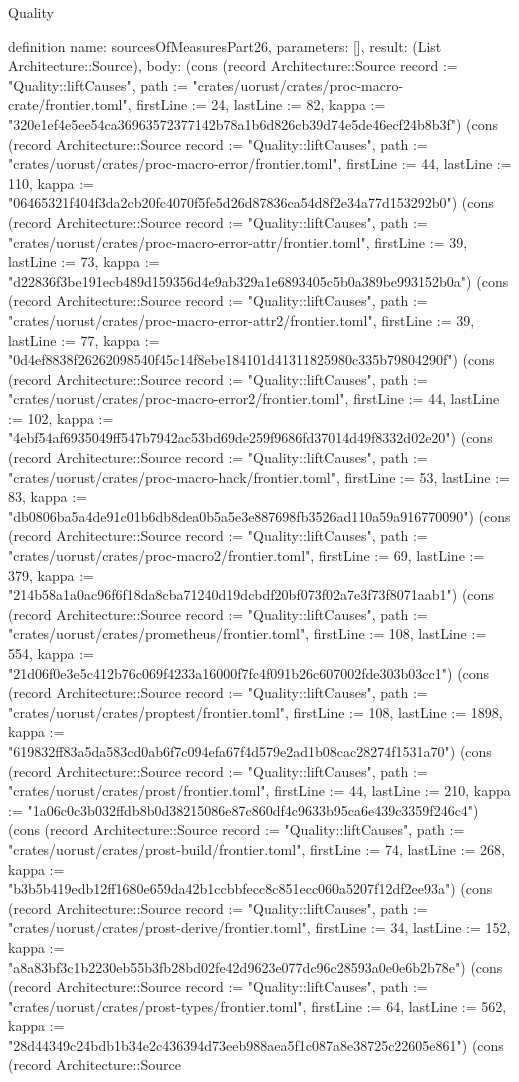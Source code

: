 \begin{lexlean}{Quality}
\begin{semanticmodule}
definition{
  name: sourcesOfMeasuresPart26,
  parameters: [],
  result: (List Architecture::Source),
  body: (cons (record Architecture::Source {record := "Quality::liftCauses", path := "crates/uorust/crates/proc-macro-crate/frontier.toml", firstLine := 24, lastLine := 82, kappa := "320e1ef4e5ee54ca36963572377142b78a1b6d826cb39d74e5de46ecf24b8b3f"}) (cons (record Architecture::Source {record := "Quality::liftCauses", path := "crates/uorust/crates/proc-macro-error/frontier.toml", firstLine := 44, lastLine := 110, kappa := "06465321f404f3da2cb20fc4070f5fe5d26d87836ca54d8f2e34a77d153292b0"}) (cons (record Architecture::Source {record := "Quality::liftCauses", path := "crates/uorust/crates/proc-macro-error-attr/frontier.toml", firstLine := 39, lastLine := 73, kappa := "d22836f3be191ecb489d159356d4e9ab329a1e6893405c5b0a389be993152b0a"}) (cons (record Architecture::Source {record := "Quality::liftCauses", path := "crates/uorust/crates/proc-macro-error-attr2/frontier.toml", firstLine := 39, lastLine := 77, kappa := "0d4ef8838f26262098540f45c14f8ebe184101d41311825980c335b79804290f"}) (cons (record Architecture::Source {record := "Quality::liftCauses", path := "crates/uorust/crates/proc-macro-error2/frontier.toml", firstLine := 44, lastLine := 102, kappa := "4ebf54af6935049ff547b7942ac53bd69de259f9686fd37014d49f8332d02e20"}) (cons (record Architecture::Source {record := "Quality::liftCauses", path := "crates/uorust/crates/proc-macro-hack/frontier.toml", firstLine := 53, lastLine := 83, kappa := "db0806ba5a4de91c01b6db8dea0b5a5e3e887698fb3526ad110a59a916770090"}) (cons (record Architecture::Source {record := "Quality::liftCauses", path := "crates/uorust/crates/proc-macro2/frontier.toml", firstLine := 69, lastLine := 379, kappa := "214b58a1a0ac96f6f18da8cba71240d19dcbdf20bf073f02a7e3f73f8071aab1"}) (cons (record Architecture::Source {record := "Quality::liftCauses", path := "crates/uorust/crates/prometheus/frontier.toml", firstLine := 108, lastLine := 554, kappa := "21d06f0e3e5c412b76c069f4233a16000f7fc4f091b26c607002fde303b03cc1"}) (cons (record Architecture::Source {record := "Quality::liftCauses", path := "crates/uorust/crates/proptest/frontier.toml", firstLine := 108, lastLine := 1898, kappa := "619832ff83a5da583cd0ab6f7c094efa67f4d579e2ad1b08cac28274f1531a70"}) (cons (record Architecture::Source {record := "Quality::liftCauses", path := "crates/uorust/crates/prost/frontier.toml", firstLine := 44, lastLine := 210, kappa := "1a06c0c3b032ffdb8b0d38215086e87c860df4c9633b95ca6e439c3359f246c4"}) (cons (record Architecture::Source {record := "Quality::liftCauses", path := "crates/uorust/crates/prost-build/frontier.toml", firstLine := 74, lastLine := 268, kappa := "b3b5b419edb12ff1680e659da42b1ccbbfecc8c851ecc060a5207f12df2ee93a"}) (cons (record Architecture::Source {record := "Quality::liftCauses", path := "crates/uorust/crates/prost-derive/frontier.toml", firstLine := 34, lastLine := 152, kappa := "a8a83bf3c1b2230eb55b3fb28bd02fe42d9623e077dc96c28593a0e0e6b2b78e"}) (cons (record Architecture::Source {record := "Quality::liftCauses", path := "crates/uorust/crates/prost-types/frontier.toml", firstLine := 64, lastLine := 562, kappa := "28d44349c24bdb1b34e2c436394d73eeb988aea5f1c087a8e38725c22605e861"}) (cons (record Architecture::Source }
\end{semanticmodule}
\end{lexlean}
